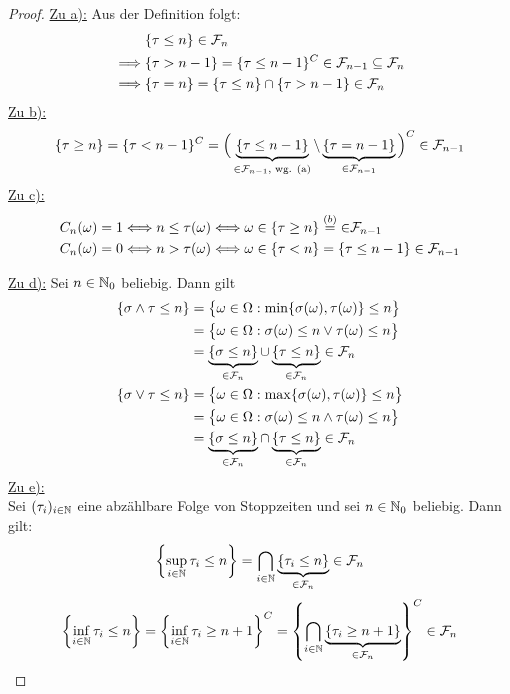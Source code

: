 \begin{proof}
\underline{Zu a):} Aus der Definition folgt:
\begin{align*}
	&\{\tau \leq n\} \in \mathcal{F}_n \\
	\implies & \{\tau > n-1\} = \{\tau \leq n-1\}^C \in \mathcal{F}_{n-1} \subseteq \mathcal{F}_n \\
	\implies & \{\tau = n\} = \{\tau \leq n\} \cap \{\tau > n-1\} \in \mathcal{F}_n
\end{align*}
\underline{Zu b):}
\begin{align*}
	\{\tau \geq n \} =\lbrace\tau <n-1\rbrace^C= \Big(\underbrace{\{\tau \leq n-1 \}}_{\in\mathcal{F}_{n-1}\text{, wg. (a)}} \setminus \underbrace{\{\tau = n-1 \}}_{\in\mathcal{F}_{n-1}} \Big)^C \in \mathcal{F}_{n-1}
\end{align*}
\underline{Zu c):}
\begin{align*}
C_n(\omega)&=1\Longleftrightarrow n\leq\tau(\omega)\Longleftrightarrow
\omega\in\lbrace\tau\geq n\rbrace\stackrel{(b)}{=}{\in}\mathcal{F}_{n-1}\\
C_n(\omega)&=0\Longleftrightarrow
n>\tau(\omega)\Longleftrightarrow
\omega\in\lbrace\tau<n\rbrace=\lbrace\tau\leq n-1\rbrace\in\mathcal{F}_{n-1}
\end{align*}

\underline{Zu d):} Sei $n\in\mathbb{N}_0$ beliebig. Dann gilt
\begin{align*}
\{\sigma \wedge \tau \leq n \}
&=\big\lbrace\omega\in\Omega:\min\lbrace\sigma(\omega),\tau(\omega)\rbrace\leq n\big\rbrace\\
&=\big\lbrace\omega\in\Omega:\sigma(\omega)\leq n\vee\tau(\omega)\leq n\big\rbrace\\
&=\underbrace{\{\sigma \leq n\}}_{\in \mathcal{F}_n} \cup \underbrace{\{\tau \leq n\}}_{\in\mathcal{F}_n} \in \mathcal{F}_n \\
\{\sigma \vee \tau \leq n \}
&=\big\lbrace\omega\in\Omega:\max\lbrace\sigma(\omega),\tau(\omega)\rbrace\leq n\big\rbrace\\
&=\big\lbrace\omega\in\Omega:\sigma(\omega)\leq n\wedge\tau(\omega)\leq n\big\rbrace\\
&=\underbrace{\{\sigma \leq n\}}_{\in \mathcal{F}_n} \cap \underbrace{\{\tau \leq n\}}_{\in\mathcal{F}_n} \in \mathcal{F}_n \\
\end{align*}
\underline{Zu e):}\\
Sei $(\tau_i)_{i\in\mathbb{N}}$ eine abzählbare Folge von Stoppzeiten und sei $n\in\mathbb{N}_0$ beliebig. Dann gilt:
\begin{align*}
\left\lbrace\sup_{i\in\mathbb{N}} \tau_{i} \leq n\right\rbrace
= \bigcap_{i\in\mathbb{N}}\underbrace{\{\tau_i \leq n\}}_{\in\mathcal{F}_n} \in \mathcal{F}_n
\end{align*}
\begin{align*}
\left\lbrace\inf_{i\in\mathbb{N}} \tau_{i} \leq n\right\rbrace =
\left\lbrace\inf_{i\in\mathbb{N}} \tau_{i} \geq n+1\right\rbrace^C = \left\lbrace\bigcap_{i\in\mathbb{N}}\underbrace{\{\tau_i \geq n+1\}}_{\in\mathcal{F}_n}\right\rbrace^C \in \mathcal{F}_n
\end{align*}
\end{proof}


